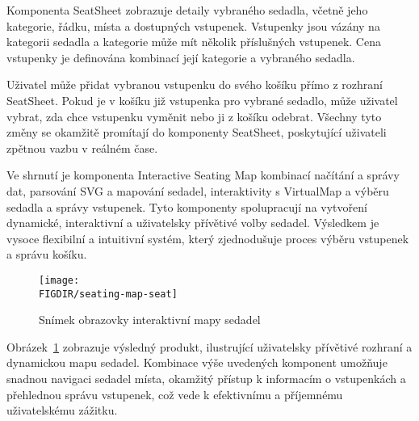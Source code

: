 Komponenta SeatSheet zobrazuje detaily vybraného sedadla, včetně jeho kategorie, řádku, místa a dostupných vstupenek.
Vstupenky jsou vázány na kategorii sedadla a kategorie může mít několik příslušných vstupenek.
Cena vstupenky je definována kombinací její kategorie a vybraného sedadla.

Uživatel může přidat vybranou vstupenku do svého košíku přímo z rozhraní SeatSheet.
Pokud je v košíku již vstupenka pro vybrané sedadlo, může uživatel vybrat, zda chce vstupenku vyměnit nebo ji z košíku odebrat.
Všechny tyto změny se okamžitě promítají do komponenty SeatSheet, poskytující uživateli zpětnou vazbu v reálném čase.

Ve shrnutí je komponenta Interactive Seating Map kombinací načítání a správy dat, parsování SVG a mapování sedadel, interaktivity s VirtualMap a výběru sedadla a správy vstupenek.
Tyto komponenty spolupracují na vytvoření dynamické, interaktivní a uživatelsky přívětivé volby sedadel.
Výsledkem je vysoce flexibilní a intuitivní systém, který zjednodušuje proces výběru vstupenek a správu košíku.

\begin{figure}[h]
	\centering
	\texttt{[image: \\FIGDIR/seating-map-seat]}
	\caption{Snímek obrazovky interaktivní mapy sedadel}
	\label{fig:seating-map-seat}
\end{figure}

Obrázek~\ref{fig:seating-map-seat} zobrazuje výsledný produkt, ilustrující uživatelsky přívětivé rozhraní a dynamickou mapu sedadel.
Kombinace výše uvedených komponent umožňuje snadnou navigaci sedadel místa, okamžitý přístup k informacím o vstupenkách a přehlednou správu vstupenek, což vede k efektivnímu a příjemnému uživatelskému zážitku.
